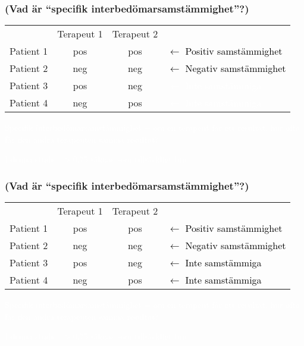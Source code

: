 \documentclass[aspectratio=169,12pt,handout,usenames,dvipsnames]{beamer}
\begin{document}
\begin{frame}
	\frametitle{(Vad är ``specifik interbedömarsamstämmighet''?)}
	{
		\setlength\extrarowheight{2pt}
		\noindent\begin{tabular}{c|ccl}
			& Terapeut 1  & Terapeut 2 & \\
			\cline{1-3}
			Patient 1 & pos & pos & \textcolor{black}{$\leftarrow$ Positiv samstämmighet}\\
			Patient 2 & neg & neg &\textcolor{black}{$\leftarrow$ Negativ samstämmighet}\\
			Patient 3 & pos & neg &\textcolor{white}{$\leftarrow$ Inte samstämmiga}\\
			Patient 4 & neg & pos &\textcolor{white}{$\leftarrow$ Inte samstämmiga}\\
		\end{tabular}
	}\par
	\vspace{2em}
	\par \textcolor{white}{Specifik interbedömarsamstämmighet = om en terapeut får ett resultat, hur ofta får den andra terapeuten samma resultat?}
	\vspace{1em}
	\par \textcolor{white}{I denna studie: $>$0.75 räknas som tillräckligt bra.}
\end{frame}

\begin{frame}
	\frametitle{(Vad är ``specifik interbedömarsamstämmighet''?)}
	{
		\setlength\extrarowheight{2pt}
		\noindent\begin{tabular}{c|ccl}
			& Terapeut 1  & Terapeut 2 & \\
			\cline{1-3}
			Patient 1 & pos & pos & \textcolor{black}{$\leftarrow$ Positiv samstämmighet}\\
			Patient 2 & neg & neg &\textcolor{black}{$\leftarrow$ Negativ samstämmighet}\\
			Patient 3 & pos & neg &\textcolor{black}{$\leftarrow$ Inte samstämmiga}\\
			Patient 4 & neg & pos &\textcolor{black}{$\leftarrow$ Inte samstämmiga}\\
		\end{tabular}
	}\par
	\vspace{2em}
	\par \textcolor{white}{Specifik interbedömarsamstämmighet = om en terapeut får ett resultat, hur ofta får den andra terapeuten samma resultat?}
	\vspace{1em}
	\par \textcolor{white}{I denna studie: $>$0.75 räknas som tillräckligt bra.}
\end{frame}
\end{document}
